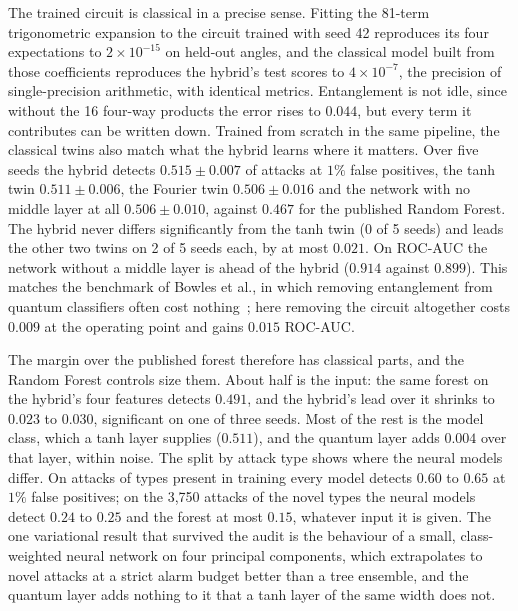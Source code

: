 \documentclass[preprint,11pt]{elsarticle}
\begin{document}
The trained circuit is classical in a precise sense. Fitting the 81-term trigonometric expansion to the
circuit trained with seed 42 reproduces its four expectations to $2\times10^{-15}$ on held-out angles, and
the classical model built from those coefficients reproduces the hybrid's test scores to $4\times10^{-7}$,
the precision of single-precision arithmetic, with identical metrics. Entanglement is not idle, since
without the 16 four-way products the error rises to $0.044$, but every term it contributes can be written
down. Trained from scratch in the same pipeline, the classical twins also match what the hybrid learns
where it matters. Over five seeds the hybrid detects $0.515\pm0.007$ of attacks at $1\%$ false positives,
the tanh twin $0.511\pm0.006$, the Fourier twin $0.506\pm0.016$ and the network with no middle layer at
all $0.506\pm0.010$, against $0.467$ for the published Random Forest. The hybrid never differs
significantly from the tanh twin (0 of 5 seeds) and leads the other two twins on 2 of 5 seeds each, by at
most $0.021$. On ROC-AUC the network without a middle layer is ahead of the hybrid ($0.914$ against $0.899$). This
matches the benchmark of Bowles et al., in which removing entanglement from quantum classifiers often
cost nothing~\cite{bowles2024better}; here removing the circuit altogether costs $0.009$ at the operating
point and gains $0.015$ ROC-AUC.

The margin over the published forest therefore has classical parts, and the Random Forest controls size
them. About half is the input: the same forest on the hybrid's four features detects $0.491$, and the
hybrid's lead over it shrinks to $0.023$ to $0.030$, significant on one of three seeds. Most of the rest is
the model class, which a tanh layer supplies ($0.511$), and the quantum layer adds $0.004$ over that layer,
within noise. The split by attack type shows where the neural models differ. On attacks of types present
in training every model detects $0.60$ to $0.65$ at $1\%$ false positives; on the 3{,}750 attacks of the
novel types the neural models detect $0.24$ to $0.25$ and the forest at most $0.15$, whatever input it is
given. The one variational result that survived the audit is the behaviour of a small, class-weighted
neural network on four principal components, which extrapolates to novel attacks at a strict alarm
budget better than a tree ensemble, and the quantum layer adds nothing to it that a tanh layer of the
same width does not.
\end{document}
